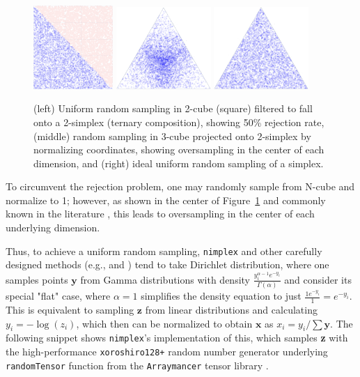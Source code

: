\begin{figure}[h]
    \centering
    \includegraphics[width=0.270\textwidth]{nimplex/1A.png}
    \hfill
    \includegraphics[width=0.320\textwidth]{nimplex/1C.png}
    \hfill
    \includegraphics[width=0.320\textwidth]{nimplex/1B.png}
    \caption{(left) Uniform random sampling in 2-cube (square) filtered to fall onto a 2-simplex (ternary composition), showing 50\% rejection rate, (middle) random sampling in 3-cube projected onto 2-simplex by normalizing coordinates, showing oversampling in the center of each dimension, and (right) ideal uniform random sampling of a simplex.} 
    \label{nimplex:fig:samplinginternary}
\end{figure}

To circumvent the rejection problem, one may randomly sample from N-cube and normalize to 1; however, as shown in the center of Figure~\ref{nimplex:fig:samplinginternary} and commonly known in the literature \cite{Otis2017AnSystems}, this leads to oversampling in the center of each underlying dimension.

Thus, to achieve a uniform random sampling, \texttt{nimplex} and other carefully designed methods (e.g., \cite{Allen2022AAlloys} and \cite{Otis2017AnSystems}) tend to take Dirichlet distribution, where one samples points $\textbf{y}$ from Gamma distributions with density $\frac{y_i^{\alpha-1} e^{-y_i}}{\Gamma(\alpha)}$ and consider its special "flat" case, where $\alpha=1$ simplifies the density equation to just $\frac{1 e^{-y_i}}{1} = e^{-y_i}$. This is equivalent to sampling $\textbf{z}$ from linear distributions and calculating $y_i=-\log(z_i)$, which then can be normalized to obtain $\textbf{x}$ as $x_i = y_i / \sum \textbf{y}$. The following snippet shows \texttt{nimplex}'s implementation of this, which samples \textbf{z} with the high-performance \texttt{xoroshiro128+} random number generator \cite{Blackman2018ScrambledGenerators} underlying \texttt{randomTensor} function from the \texttt{Arraymancer} tensor library \cite{RatsimbazafyMratsim/Arraymancer:Backends}.

